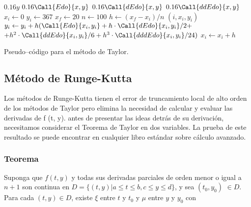 \documentclass[english,spanish,Ce-table,Ce-theorem]{CabesHW}
\begin{document}
\begin{algorithm}[H]
    \centering
    \begin{myalg}[1]
     
        \State \Output $0.16 y$
    \EndFunction
    \State \phantom{}
     
        \State \Output $0.16 \Call{Edo}{x,y}$
    \EndFunction
    \State \phantom{}
     
        \State \Output $0.16 \Call{dEdo}{x,y}$
    \EndFunction
    \State \phantom{}
     
        \State \Output $0.16 \Call{ddEdo}{x,y}$
    \EndFunction
    \State \phantom{}
    \State $x_i \gets 0$ 
    \State $y_i \gets 367$ 
    \State $x_f \gets 20$ 
    \State $n \gets 100$ 
    \State \phantom{}
    \State $h \gets (x_f - x_i)/n$ 
        \State \Output $(i, x_i, y_i)$
        \State \phantom{}
        \State $y_i \gets y_i + h(\Call{Edo}{x_i, y_i} + h\cdot\Call{dEdo}{x_i, y_i}/2 + $
        \Statex \hspace{5em}$+ h^2\cdot\Call{ddEdo}{x_i, y_i}/6 + h^3\cdot\Call{dddEdo}{x_i, y_i}/24)$
        \State $x_i \gets x_i + h$
    \EndFor
    \end{myalg}
    \caption{Pseudo--código para el método de Taylor.}
    \label{alg:taylor}
\end{algorithm}

\subsection{Método de Runge-Kutta}
Los métodos de Runge-Kutta tienen el error de truncamiento local de alto orden de los métodos de Taylor pero elimina la necesidad de calcular y evaluar las derivadas de f (t, y). antes de presentar las ideas detrás de su derivación, necesitamos considerar el Teorema de Taylor en dos variables. La prueba de este resultado se puede encontrar en cualquier libro estándar sobre cálculo avanzado.

\subsubsection{Teorema}
Suponga que $f (t, y)$ y todas sus derivadas parciales de orden menor o igual a $n + 1$ son continua en $ D = \{(t, y) | a \leq t \leq b, c \leq y \leq d\}$, y sea $(t_0,y_0)$ $\in D$. Para cada $(t, y) \in D$, existe $\xi$ entre $t$  y $t_0$ y $\mu$ entre  $y$ y $y_0$ con
\end{document}
